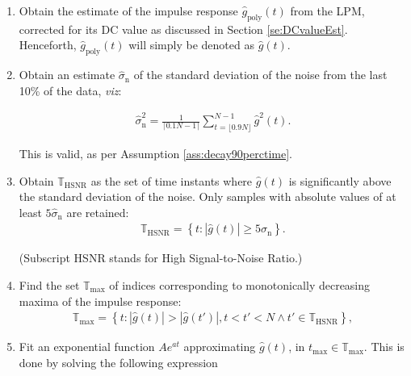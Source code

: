 \begin{enumerate}
\item Obtain the estimate of the impulse response $\hat g_\mathrm{poly}(t)$ from the LPM, corrected for its DC value as discussed in Section \ref{se:DCvalueEst}. Henceforth, $\hat g_\mathrm{poly}(t)$ will simply be denoted as $\hat g(t)$. %

\item Obtain an estimate $\hat \sigma_\mathrm{n}$ of the standard deviation of the noise from the last 10\% of the data, \emph{viz}:

\begin{align}
\hat \sigma^2_\mathrm{n}=\frac{1}{\lceil0.1N - 1\rceil}\sum_{t=\lfloor0.9N\rfloor}^{N-1}\hat g^2(t).
\end{align}

\noindent
This is valid, as per Assumption \ref{ass:decay90perctime}.


\item Obtain $\mathbb{T}_\mathrm{HSNR}$ as the set of time instants where $\hat g(t)$ is significantly above the standard deviation of the noise. Only samples with absolute values of at least $5\hat\sigma_\mathrm{n}$ are retained: %
\begin{align}
\mathbb{T}_\mathrm{HSNR} = \left\{
t:|\hat g(t)|\geqslant 5\hat\sigma_\mathrm{n}
\right\}.
\end{align}

\noindent
(Subscript HSNR stands for High Signal-to-Noise Ratio.)


\item Find the set $\mathbb{T}_\mathrm{max}$ of indices corresponding to monotonically decreasing maxima of the impulse response:
\begin{align}\label{eq:TmaxDef}
\mathbb{T}_\mathrm{max} = \left\{
t: \left| \hat g(t)\right|>
\left|\hat g(t')\right|,
t < t' < N \land t'\in\mathbb{T}_\mathrm{HSNR}
\right\},
\end{align}

\item Fit an exponential function $Ae^{at}$ approximating $\hat g(t)$, in $t_\mathrm{max}\in\mathbb{T}_\mathrm{max}$. This is done by solving the following expression


\end{enumerate}
